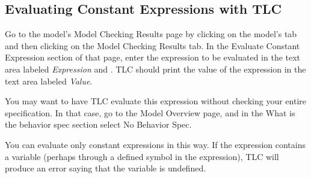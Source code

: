 \documentclass[fleqn,leqno]{article}
\begin{document}
  \vspace{-2\baselineskip}%
\subsection*{Evaluating Constant Expressions with TLC} 

Go to the model's \textsf{Model Checking Results} page by clicking on
the model's tab and then clicking on the \textsf{Model Checking
Results} tab.  In the \textsf{Evaluate Constant Expression} section of
that page, enter the expression to be evaluated in the text area
labeled \emph{Expression} and \@.  TLC should
print the value of the expression in the text area labeled
\emph{Value}.

\medskip

\noindent
You may want to have TLC evaluate this expression without checking
your entire specification.  In that case, go to the \textsf{Model
Overview} page, and in the \textsf{What is the behavior spec} section
select \textsf{No Behavior Spec}.

\medskip
 \noindent
You can evaluate only constant expressions in this way.  If the expression
contains a variable (perhaps through a defined symbol in the expression),
TLC will produce an error saying that the variable is undefined.
\end{document}
